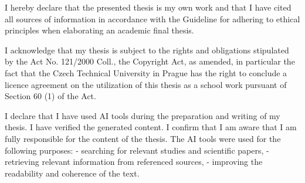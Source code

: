 
\begin{declarationpage}
\begin{markdown}
I hereby declare that the presented thesis is my own work and that I have cited all sources of
information in accordance with the Guideline for adhering to ethical principles when elaborating an
academic final thesis.

I acknowledge that my thesis is subject to the rights and obligations stipulated by the Act No.
121/2000 Coll., the Copyright Act, as amended, in particular the fact that the Czech Technical
University in Prague has the right to conclude a licence agreement on the utilization of this thesis as
a school work pursuant of Section 60 (1) of the Act.

I declare that I have used AI tools during the preparation and writing of my thesis. I have verified
the generated content. I confirm that I am aware that I am fully responsible for the content of the
thesis. The AI tools were used for the following purposes:
- searching for relevant studies and scientific papers,
- retrieving relevant information from referenced sources,
- improving the readability and coherence of the text.
\end{markdown}
\end{declarationpage}
